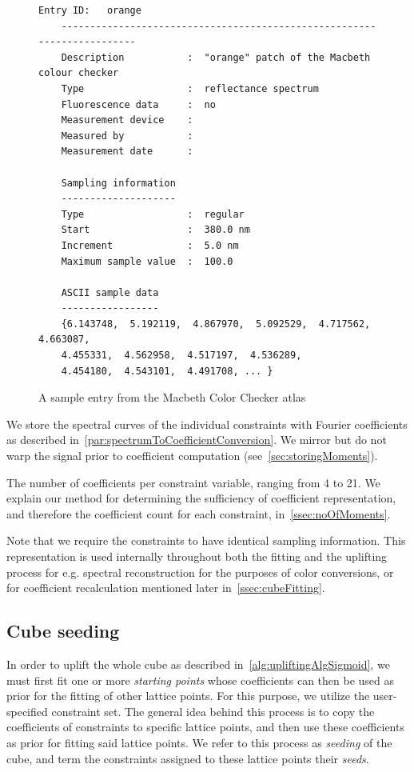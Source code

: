 \begin{figure}
	\begin{lstlisting}[label=lst:atlasEntry]
	Entry ID:   orange
	------------------------------------------------------------------------
	Description           :  "orange" patch of the Macbeth colour checker
	Type                  :  reflectance spectrum
	Fluorescence data     :  no
	Measurement device    :  
	Measured by           :  
	Measurement date      :  
	
	Sampling information
	--------------------
	Type	    	      :  regular
	Start                 :  380.0 nm
	Increment             :  5.0 nm
	Maximum sample value  :  100.0
	
	ASCII sample data
	-----------------
	{6.143748,  5.192119,  4.867970,  5.092529,  4.717562,  4.663087, 
	4.455331,  4.562958,  4.517197,  4.536289,
	4.454180,  4.543101,  4.491708, ... }
	\end{lstlisting}
	\caption{A sample entry from the Macbeth Color Checker atlas}
	\label{fig:macbethSampleText}
\end{figure}

We store the spectral curves of the individual constraints with Fourier coefficients as described in~\cref{par:spectrumToCoefficientConversion}. We mirror but do not warp the signal prior to coefficient computation (see~\cref{sec:storingMoments}).

The number of coefficients per constraint variable, ranging from 4 to 21. We explain our method for determining the sufficiency of coefficient representation, and therefore the coefficient count for each constraint, in~\cref{ssec:noOfMoments}.

Note that we require the constraints to have identical sampling information. This representation is used internally throughout both the fitting and the uplifting process for e.g. spectral reconstruction for the purposes of color conversions, or for coefficient recalculation mentioned later in~\cref{ssec:cubeFitting}.

\subsection{Cube seeding} \label{ssec:cubeSeeding}

In order to uplift the whole cube as described in~\cref{alg:upliftingAlgSigmoid}, we must first fit one or more \emph{starting points} whose coefficients can then be used as prior for the fitting of other lattice points. For this purpose, we utilize the user-specified constraint set. The general idea behind this process is to copy the coefficients of constraints to specific lattice points, and then use these coefficients as prior for fitting said lattice points. We refer to this process as \emph{seeding} of the cube, and term the constraints assigned to these lattice points their \emph{seeds}.

